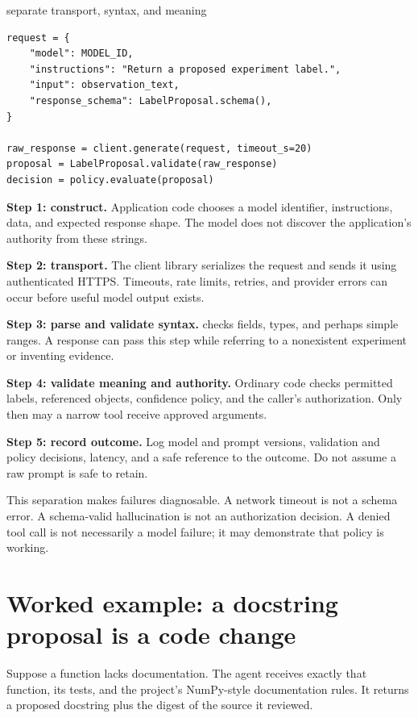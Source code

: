 \begin{workedexample}{separate transport, syntax, and meaning}
\begin{lstlisting}
request = {
    "model": MODEL_ID,
    "instructions": "Return a proposed experiment label.",
    "input": observation_text,
    "response_schema": LabelProposal.schema(),
}

raw_response = client.generate(request, timeout_s=20)
proposal = LabelProposal.validate(raw_response)
decision = policy.evaluate(proposal)
\end{lstlisting}

\textbf{Step 1: construct.} Application code chooses a model identifier,
instructions, data, and expected response shape. The model does not discover
the application's authority from these strings.

\textbf{Step 2: transport.} The client library serializes the request and sends
it using authenticated HTTPS. Timeouts, rate limits, retries, and provider
errors can occur before useful model output exists.

\textbf{Step 3: parse and validate syntax.} 
checks fields, types, and perhaps simple ranges. A response can pass this step
while referring to a nonexistent experiment or inventing evidence.

\textbf{Step 4: validate meaning and authority.} Ordinary code checks permitted
labels, referenced objects, confidence policy, and the caller's authorization.
Only then may a narrow tool receive approved arguments.

\textbf{Step 5: record outcome.} Log model and prompt versions, validation and
policy decisions, latency, and a safe reference to the outcome. Do not assume a
raw prompt is safe to retain.
\end{workedexample}

This separation makes failures diagnosable. A network timeout is not a schema
error. A schema-valid hallucination is not an authorization decision. A denied
tool call is not necessarily a model failure; it may demonstrate that policy is
working.

\section{Worked example: a docstring proposal is a code change}

Suppose a function lacks documentation. The agent receives exactly that
function, its tests, and the project's NumPy-style documentation rules. It
returns a proposed docstring plus the digest of the source it reviewed.


